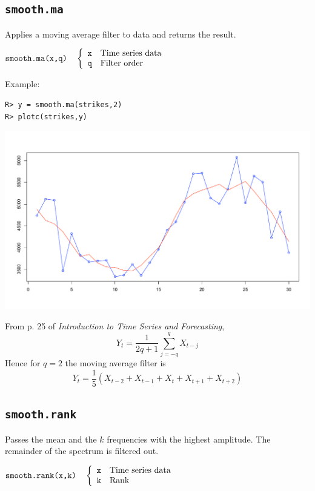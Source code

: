 \documentclass[12pt]{article}
\begin{document}
\newpage

\subsection{\tt smooth.ma}
Applies a moving average filter to data and returns the result.

\bigskip
$
\hbox{\tt smooth.ma(x,q)}\quad\left\{\begin{array}{ll}
{\tt x} & \hbox{Time series data}\\
{\tt q} & \hbox{Filter order}
\end{array}\right.
$

\bigskip
\noindent
Example:

\begin{verbatim}
R> y = smooth.ma(strikes,2)
R> plotc(strikes,y)
\end{verbatim}

\begin{center}
\includegraphics[scale=0.3]{Rplot-10.pdf}
\end{center}

\bigskip
\noindent
From p. 25 of {\it Introduction to Time Series and Forecasting},
\[
Y_t=\frac{1}{2q+1}\sum_{j=-q}^qX_{t-j}
\]
Hence for $q=2$ the moving average filter is
\[
Y_t=\frac{1}{5}(X_{t-2}+X_{t-1}+X_t+X_{t+1}+X_{t+2})
\]

\newpage

\subsection{\tt smooth.rank}
Passes the mean and the $k$ frequencies
with the highest amplitude.
The remainder of the spectrum is filtered out.

\bigskip
$
\hbox{\tt smooth.rank(x,k)}\quad\left\{
\begin{array}{ll}
{\tt x} & \hbox{Time series data}\\
{\tt k} & \hbox{Rank}
\end{array}\right.
$
\end{document}

